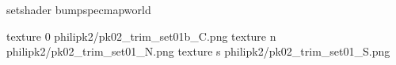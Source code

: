 setshader bumpspecmapworld

texture 0 philipk2/pk02_trim_set01b_C.png
texture n philipk2/pk02_trim_set01_N.png
texture s philipk2/pk02_trim_set01_S.png

